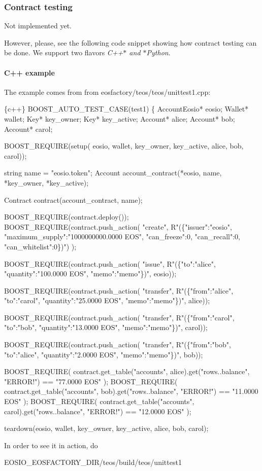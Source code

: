 \subsubsection*{Contract testing}

Not implemented yet.

However, please, see the following code snippet showing how contract testing can be done. We support two flavors {\itshape C++$\ast$ and $\ast$\+Python}.

\paragraph*{C++ example}

The example comes from from {\ttfamily eosfactory/teos/teos/unittest1.\+cpp}\+: 
\begin{DoxyCode}
\{c++\}
BOOST\_AUTO\_TEST\_CASE(test1)
\{
  AccountEosio* eosio;
  Wallet* wallet;
  Key* key\_owner; 
  Key* key\_active;
  Account* alice;
  Account* bob;
  Account* carol;

  BOOST\_REQUIRE(setup(
    eosio, wallet, key\_owner, key\_active, alice, bob, carol));

  string name = "eosio.token";
  Account account\_contract(*eosio, name, *key\_owner, *key\_active);

  Contract contract(account\_contract, name);

  BOOST\_REQUIRE(contract.deploy());
  BOOST\_REQUIRE(contract.push\_action(
    "create", 
    R"(\{"issuer":"eosio", "maximum\_supply":"1000000000.0000 EOS", "can\_freeze":0, "can\_recall":0,
       "can\_whitelist":0\})")
  );

  BOOST\_REQUIRE(contract.push\_action(
    "issue", 
    R"(\{"to":"alice", "quantity":"100.0000 EOS", "memo":"memo"\})", eosio));

  BOOST\_REQUIRE(contract.push\_action(
    "transfer", 
    R"(\{"from":"alice", "to":"carol", "quantity":"25.0000 EOS", "memo":"memo"\})", 
    alice));

  BOOST\_REQUIRE(contract.push\_action(
    "transfer", 
    R"(\{"from":"carol", "to":"bob", "quantity":"13.0000 EOS", "memo":"memo"\})", 
    carol));

  BOOST\_REQUIRE(contract.push\_action(
    "transfer", 
    R"(\{"from":"bob", "to":"alice", "quantity":"2.0000 EOS", "memo":"memo"\})", bob));

  BOOST\_REQUIRE(
    contract.get\_table("accounts", alice).get("rows..balance", "ERROR!") 
      == "77.0000 EOS"
  );
  BOOST\_REQUIRE(
    contract.get\_table("accounts", bob).get("rows..balance", "ERROR!") 
      == "11.0000 EOS"
  );
  BOOST\_REQUIRE(
    contract.get\_table("accounts", carol).get("rows..balance", "ERROR!") 
      == "12.0000 EOS"
  );

  teardown(eosio, wallet, key\_owner, key\_active, alice, bob, carol);
\end{DoxyCode}
 In order to see it in action, do 
\begin{DoxyCode}
$ $EOSIO\_EOSFACTORY\_DIR/teos/build/teos/unittest1
\end{DoxyCode}


